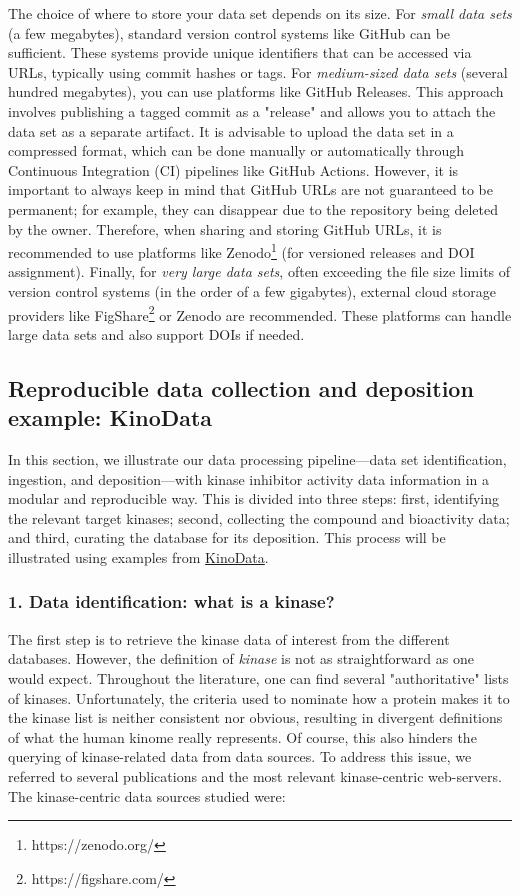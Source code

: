 \documentclass[9pt,lessons]{livecoms}
\begin{document}
The choice of where to store your data set depends on its size. 
For \textit{small data sets} (a few megabytes), standard version control systems like GitHub can be sufficient. 
These systems provide unique identifiers that can be accessed via URLs, typically using commit hashes or tags. 
For \textit{medium-sized data sets} (several hundred megabytes), you can use platforms like GitHub Releases. This approach involves publishing a tagged commit as a "release" and allows you to attach the data set as a separate artifact. It is advisable to upload the data set in a compressed format, which can be done manually or automatically through Continuous Integration (CI) pipelines like GitHub Actions.
However, it is important to always keep in mind that GitHub URLs are not guaranteed to be permanent; for example, they can disappear due to the repository being deleted by the owner. Therefore, when sharing and storing GitHub URLs, it is recommended to use platforms like Zenodo\footnote{https://zenodo.org/}  (for versioned releases and DOI assignment). 
Finally, for \textit{very large data sets}, often exceeding the file size limits of version control systems (in the order of a few gigabytes), external cloud storage providers like FigShare\footnote{https://figshare.com/} or Zenodo are recommended. These platforms can handle large data sets and also support DOIs if needed.

\subsection{Reproducible data collection and deposition example: KinoData}

In this section, we illustrate our data processing pipeline---data set identification, ingestion, and deposition---with kinase inhibitor activity data information in a modular and reproducible way. 
This is divided into three steps: first, identifying the relevant target kinases; second, collecting the compound and bioactivity data; and third, curating the database for its deposition. 
This process will be illustrated using examples from \href{https://github.com/openkinome/kinodata/}{KinoData}. 

\subsubsection{1. Data identification: what is a kinase?}
The first step is to retrieve the kinase data of interest from the different databases.
However, the definition of \textit{kinase} is not as straightforward as one would expect. 
Throughout the literature, one can find several "authoritative" lists of kinases. 
Unfortunately, the criteria used to nominate how a protein makes it to the kinase list is neither consistent nor obvious, resulting in divergent definitions of what the human kinome really represents. Of course, this also hinders the querying of kinase-related data from data sources. 
To address this issue, we referred to several publications and the most relevant kinase-centric web-servers. 
The kinase-centric data sources studied were: 
\end{document}
